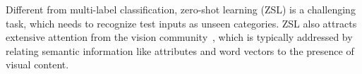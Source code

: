 \documentclass[10pt,twocolumn,letterpaper]{article}
\begin{document}
Different from multi-label classification, zero-shot learning (ZSL) is a challenging task, which needs to recognize test inputs as unseen categories. ZSL also attracts extensive attention from the vision community~\cite{NIPS2009_0395,akata2013label,socher2013zero,frome2013devise,NIPS2014_5290,norouzi14iclr,embedding2014ECCV,Lampert:2014:ACZ:2587733.2587824,akata2015evaluation,ba15iccv}, which is typically addressed by relating semantic information like attributes \cite{lampert2009learning,FarhadiEHF09} and word vectors \cite{NIPS2013_5021,pennington2014glove} to the presence of visual content.%
	\centering
\end{document}
